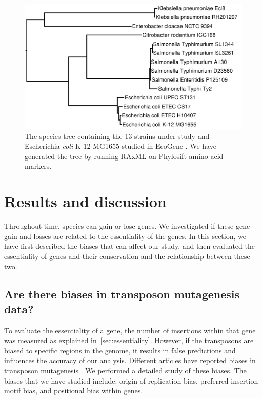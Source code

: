 \documentclass[12pt,letterpaper]{article}
\begin{document}
\begin{figure}
\includegraphics[scale=0.2]{phylosift-aa-raxmlbootstrap.pdf}
\caption{The species tree containing the 13 strains under study and Escherichia \textit{coli} K-12 MG1655 studied in EcoGene \cite{zhou_ecogene_2013}. We have generated the tree by running RAxML \cite{stamatakis_raxml_2014} on Phylosift \cite{darling_phylosift:_2014} amino acid markers.}
\label{fig:species-tree}
\end{figure}

\section{Results and discussion}
Throughout time, species can gain or lose genes. We investigated if these gene gain and losses are related to the essentiality of the genes. In this section, we have first described the biases that can affect our study, and then evaluated the essentiality of genes and their conservation and the relationship between these two.

\subsection{Are there biases in transposon mutagenesis data?}
To evaluate the essentiality of a gene, the number of insertions within that gene was measured as explained in~\ref{sec:essentiality}. However, if the transposons are biased to specific regions in the genome, it results in false predictions and influences the accuracy of our analysis. Different articles have reported biases in transposon mutagenesis \cite{barquist_comparison_2013, rubin_essential_2015, kimura_nucleoid_2016}. We performed a detailed study of these biases. The biases that we have studied include: origin of replication bias, preferred insertion motif bias, and positional bias within genes.
\end{document}

